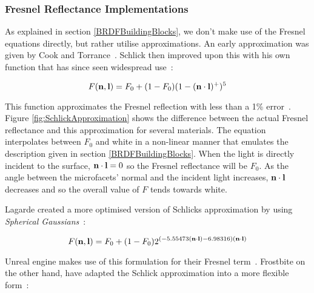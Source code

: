\subsubsection{Fresnel Reflectance Implementations}

As explained in section \ref{BRDFBuildingBlocks}, we don't make use of the Fresnel equations directly, but rather utilise approximations. An early approximation was given by Cook and Torrance~\cite{CookTorrance}. Schlick then improved upon this with his own function that has since seen widespread use~\cite{SchlickApproximation}:

\begin{equation}
	F(\mathbf{n}, \mathbf{l}) = F_0 + (1 - F_0)(1 - (\mathbf{n}\cdot\mathbf{l})^+)^5
\end{equation}

This function approximates the Fresnel reflection with less than a 1\% error~\cite{SchlickApproximation}. Figure \ref{fig:SchlickApproximation} shows the difference between the actual Fresnel reflectance and this approximation for several materials. The equation interpolates between \begin{math}F_0\end{math} and white in a non-linear manner that emulates the description given in section \ref{BRDFBuildingBlocks}. When the light is directly incident to the surface, \begin{math}\mathbf{n}\cdot\mathbf{l} = 0\end{math} so the Fresnel reflectance will be \begin{math}F_0\end{math}. As the angle between the microfacets' normal and the incident light increases, \begin{math}\mathbf{n}\cdot\mathbf{l}\end{math} decreases and so the overall value of \begin{math}F\end{math} tends towards white.

Lagarde created a more optimised version of Schlicks approximation by using \textit{Spherical Gaussians}~\cite{LagardeSphericalGaussian}:

\begin{equation}
	F(\mathbf{n}, \mathbf{l}) = F_0 + (1 - F_0)2^{(-5.55473(\mathbf{n}\cdot\mathbf{l}) - 6.98316)(\mathbf{n}\cdot\mathbf{l})}
\end{equation}

Unreal engine makes use of this formulation for their Fresnel term~\cite{RealShadingInUnreal}. Frostbite on the other hand, have adapted the Schlick approximation into a more flexible form~\cite{MovingFrostbitetoPBR}:

